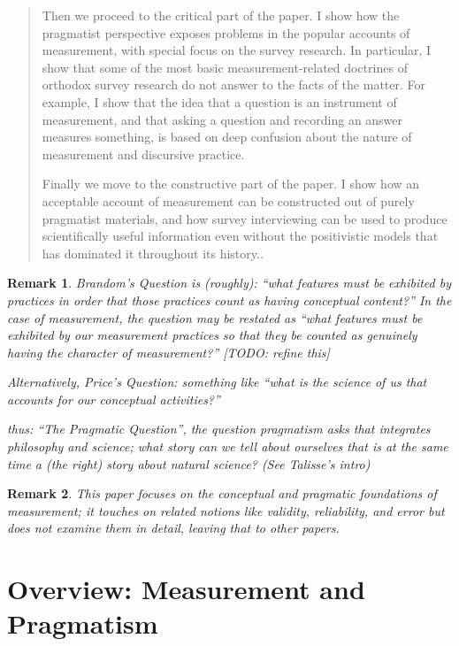 \documentclass[11pt,twoside]{article}
\newtheorem{remark}{Remark}
\begin{document}
\begin{abstract}
  Then we proceed to the critical part of the paper.  I show how the
  pragmatist perspective exposes problems in the popular accounts of
  measurement, with special focus on the survey research.  In
  particular, I show that some of the most basic measurement-related
  doctrines of orthodox survey research do not answer to the facts of
  the matter.  For example, I show that the idea that a question is an
  instrument of measurement, and that asking a question and recording
  an answer measures something, is based on deep confusion about the
  nature of measurement and discursive practice.

  Finally we move to the constructive part of the paper.  I show how
  an acceptable account of measurement can be constructed out of
  purely pragmatist materials, and how survey interviewing can be used
  to produce scientifically useful information even without the
  positivistic models that has dominated it throughout its history..
\end{abstract}

\begin{remark}
Brandom's Question is (roughly): ``what features must be exhibited by
practices in order that those practices count as having conceptual
content?''  In the case of measurement, the question may be restated
as ``what features must be exhibited by our measurement practices so
that they be counted as genuinely having the character of
measurement?'' [TODO: refine this]

Alternatively, Price's Question: something like ``what is the science
of us that accounts for our conceptual activities?''

thus: ``The Pragmatic Question'', the question pragmatism asks that
integrates philosophy and science; what story can we tell about
ourselves that is at the same time a (the right) story about natural
science?  (See Talisse's intro)
\end{remark}

\begin{remark}
  This paper focuses on the conceptual and pragmatic foundations of
  measurement; it touches on related notions like validity,
  reliability, and error but does not examine them in detail, leaving
  that to other papers.
\end{remark}

\tableofcontents
\listoffigures

\clearpage
\section{Overview: Measurement and Pragmatism}
\end{document}
